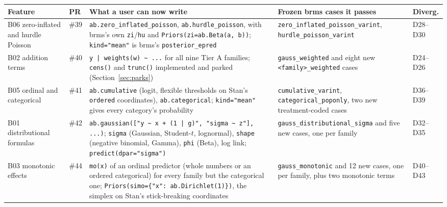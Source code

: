 \documentclass[11pt]{article}
\newcommand{\code}[1]{\texttt{#1}}
\begin{document}
\small
\begin{center}\begin{tabular}{@{}>{\raggedright\arraybackslash}p{}p{}>{\raggedright\arraybackslash}p{}>{\raggedright\arraybackslash}p{}>{\raggedright\arraybackslash}p{}@{}}
\toprule
Feature & PR & What a user can now write & Frozen brms cases it passes & Diverg. \\
\midrule
B06 zero-inflated and hurdle Poisson & \#39 & \code{ab.zero\_inflated\_poisson}, \code{ab.hurdle\_poisson}, with brms's own \code{zi}/\code{hu} and \code{Priors(zi=ab.Beta(a, b))}; \code{kind="mean"} is brms's \code{posterior\_epred} & \code{zero\_\allowbreak{}inflated\_\allowbreak{}poisson\_\allowbreak{}varint}, \code{hurdle\_\allowbreak{}poisson\_\allowbreak{}varint} & D28--D30 \\
B02 addition terms & \#40 & \code{y | weights(w) \textasciitilde{} ...} for all nine Tier A families; \code{cens()} and \code{trunc()} implemented and parked (Section~\ref{sec:parks}) & \code{gauss\_\allowbreak{}weighted} and eight new \code{<family>\_\allowbreak{}weighted} cases & D24--D26 \\
B05 ordinal and categorical & \#41 & \code{ab.cumulative} (logit, flexible thresholds on Stan's \code{ordered} coordinates), \code{ab.categorical}; \code{kind="mean"} gives every category's probability & \code{cumulative\_\allowbreak{}varint}, \code{categorical\_\allowbreak{}poponly}, two new treatment-coded cases & D36--D39 \\
B01 distributional formulas & \#42 & \code{ab.gaussian(["y \textasciitilde{} x + (1 | g)", "sigma \textasciitilde{} z"], ...)}; \code{sigma} (Gaussian, Student-$t$, lognormal), \code{shape} (negative binomial, Gamma), \code{phi} (Beta), log link; \code{predict(dpar="sigma")} & \code{gauss\_\allowbreak{}distributional\_\allowbreak{}sigma} and five new cases, one per family & D32--D35 \\
B03 monotonic effects & \#44 & \code{mo(x)} of an ordinal predictor (whole numbers or an ordered categorical) for every family but the categorical one; \code{Priors(simo=\{"x": ab.Dirichlet(1)\})}, the simplex on Stan's stick-breaking coordinates & \code{gauss\_\allowbreak{}monotonic} and 12 new cases, one per family, plus two monotonic terms & D40--D43 \\
\bottomrule
\end{tabular}\end{center}
\normalsize
\end{document}
